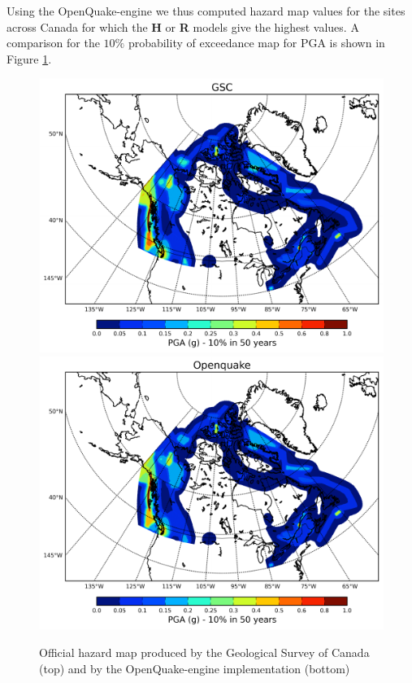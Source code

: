 Using the OpenQuake-engine we thus computed hazard map values for the sites across Canada for which the \textbf{H} or \textbf{R} models give the highest values. A comparison for the $10\%$ probability of exceedance map for PGA is shown in Figure \ref{fig:canada_475y_hmaps}.
\begin{figure}
\centering
\includegraphics[width=14cm]{./qareport/pictures/GSC_combined_PGA_0pt1_firm_ground.pdf}
\includegraphics[width=14cm]{./qareport/pictures/OQ_combined_PGA_0pt1_firm_ground.pdf}
\caption{Official hazard map produced by the Geological Survey of Canada (top) and by the OpenQuake-engine implementation (bottom)}
\label{fig:canada_475y_hmaps}
\end{figure}
